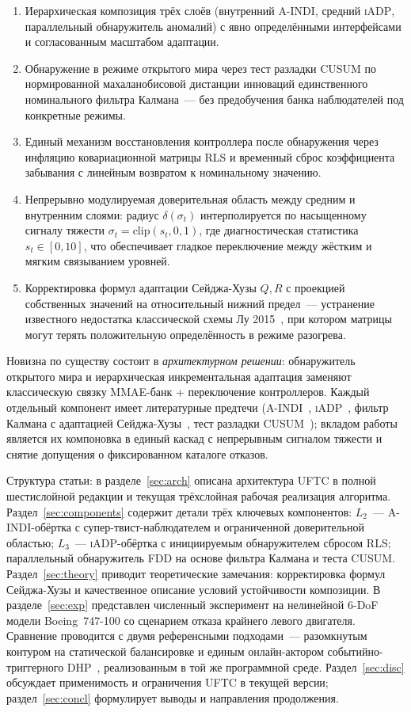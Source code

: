 \documentclass[a4paper,14pt]{extarticle}
\newcommand{\UFTC}{\textsc{UFTC}}
\newcommand{\IADP}{\textsc{iADP}}
\newcommand{\AINDI}{\textsc{A-INDI}}
\newcommand{\FDD}{\textsc{FDD}}
\newcommand{\CUSUM}{\textsc{CUSUM}}
\newcommand{\RLS}{\textsc{RLS}}
\begin{document}
\begin{enumerate}
\item Иерархическая композиция трёх слоёв (внутренний \AINDI{}, средний \IADP{}, параллельный обнаружитель аномалий) с явно определёнными интерфейсами и согласованным масштабом адаптации.
\item Обнаружение в режиме открытого мира через тест разладки \CUSUM{} по нормированной махаланобисовой дистанции инноваций единственного номинального фильтра Калмана~--- без предобучения банка наблюдателей под конкретные режимы.
\item Единый механизм восстановления контроллера после обнаружения через инфляцию ковариационной матрицы \RLS{} и временный сброс коэффициента забывания с линейным возвратом к номинальному значению.
\item Непрерывно модулируемая доверительная область между средним и внутренним слоями: радиус $\delta(\sigma_t)$ интерполируется по насыщенному сигналу тяжести $\sigma_t=\mathrm{clip}(s_t,0,1)$, где диагностическая статистика $s_t\in[0,10]$, что обеспечивает гладкое переключение между жёстким и мягким связыванием уровней.
\item Корректировка формул адаптации Сейджа-Хузы $Q,R$ с проекцией собственных значений на относительный нижний предел~--- устранение известного недостатка классической схемы Лу 2015~\cite{lu2015}, при котором матрицы могут терять положительную определённость в режиме разогрева.
\end{enumerate}

Новизна по существу состоит в \emph{архитектурном решении}: обнаружитель открытого мира и иерархическая инкрементальная адаптация заменяют классическую связку MMAE-банк + переключение контроллеров. Каждый отдельный компонент имеет литературные предтечи (\AINDI{}~\cite{aaindi2024}, \IADP{}~\cite{konatala2024}, фильтр Калмана с адаптацией Сейджа-Хузы~\cite{lu2015}, тест разладки \CUSUM{}~\cite{page1954}); вкладом работы является их компоновка в единый каскад с непрерывным сигналом тяжести и снятие допущения о фиксированном каталоге отказов.

Структура статьи: в разделе~\ref{sec:arch} описана архитектура \UFTC{} в полной шестислойной редакции и текущая трёхслойная рабочая реализация алгоритма. Раздел~\ref{sec:components} содержит детали трёх ключевых компонентов: $L_2$~--- \AINDI{}-обёртка с супер-твист-наблюдателем и ограниченной доверительной областью; $L_3$~--- \IADP{}-обёртка с инициируемым обнаружителем сбросом \RLS{}; параллельный обнаружитель \FDD{} на основе фильтра Калмана и теста \CUSUM{}. Раздел~\ref{sec:theory} приводит теоретические замечания: корректировка формул Сейджа-Хузы и качественное описание условий устойчивости композиции. В разделе~\ref{sec:exp} представлен численный эксперимент на нелинейной 6-DoF модели Boeing~747-100 со сценарием отказа крайнего левого двигателя. Сравнение проводится с двумя референсными подходами~--- разомкнутым контуром на статической балансировке и единым онлайн-актором событийно-триггерного DHP~\cite{mazaev2026etdhp}, реализованным в той же программной среде. Раздел~\ref{sec:disc} обсуждает применимость и ограничения \UFTC{} в текущей версии; раздел~\ref{sec:concl} формулирует выводы и направления продолжения.
\end{document}
